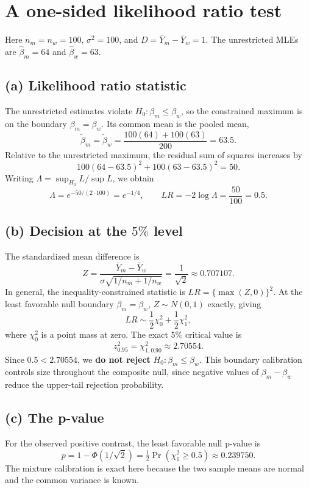 \section{A one-sided likelihood ratio test}
Here $n_m=n_w=100$, $\sigma^2=100$, and
$D=\bar Y_m-\bar Y_w=1$.
The unrestricted MLEs are
$\widehat\beta_m=64$ and $\widehat\beta_w=63$.

\subsection*{(a) Likelihood ratio statistic}
The unrestricted estimates violate $H_0:\beta_m\leq\beta_w$,
so the constrained maximum is on the boundary
$\beta_m=\beta_w$. Its common mean is the pooled mean,
\[
\widetilde\beta_m=\widetilde\beta_w
=\frac{100(64)+100(63)}{200}=63.5.
\]
Relative to the unrestricted maximum, the residual sum of squares
increases by
\[
100(64-63.5)^2+100(63-63.5)^2=50.
\]
Writing $\Lambda=\sup_{H_0}L/\sup L$, we obtain
\[
\boxed{\Lambda=e^{-50/(2\cdot100)}=e^{-1/4},
\qquad LR=-2\log\Lambda=\frac{50}{100}=0.5.}
\]

\subsection*{(b) Decision at the $5\%$ level}
The standardized mean difference is
\[
Z=\frac{\bar Y_m-\bar Y_w}
{\sigma\sqrt{1/n_m+1/n_w}}
=\frac1{\sqrt2}\approx0.707107.
\]
In general, the inequality-constrained statistic is
$LR=\{\max(Z,0)\}^2$.
At the least favorable null boundary $\beta_m=\beta_w$,
$Z\sim N(0,1)$ exactly, giving
\[
LR\sim\frac12\chi_0^2+\frac12\chi_1^2,
\]
where $\chi_0^2$ is a point mass at zero.
The exact $5\%$ critical value is
\[
z_{0.95}^2=\chi^2_{1,0.90}\approx2.70554.
\]
Since $0.5<2.70554$, we \textbf{do not reject}
$H_0:\beta_m\leq\beta_w$.
This boundary calibration controls size throughout the composite
null, since negative values of $\beta_m-\beta_w$ reduce the
upper-tail rejection probability.

\subsection*{(c) The p-value}
For the observed positive contrast, the least favorable null p-value is
\[
\boxed{p=1-\Phi(1/\sqrt2)
=\tfrac12\Pr(\chi_1^2\geq0.5)\approx0.239750.}
\]
The mixture calibration is exact here because the two sample means
are normal and the common variance is known.
